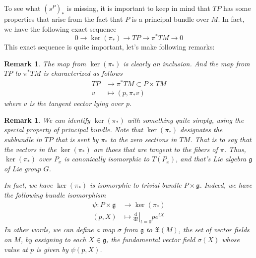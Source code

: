 \documentclass[11pt]{amsart}
\numberwithin{equation}{section}
\theoremstyle{plain}
\theoremstyle{plain}
\newtheorem{remksub}[thmsub]{Remark}
\numberwithin{equation}{section}
\begin{document}
To see what $(s^P)_*$ is missing, it is important to keep in mind that $TP$ has some properties that arise from the fact that $P$ is a principal bundle over $M$. In fact, we have the following exact sequence
\begin{equation}\label{1}
0\to\operatorname{ker}(\pi_*)\to TP\to\pi^*TM\to 0
\end{equation}
This exact sequence is quite important, let's make following remarks:
\begin{remksub}\normalfont
The map from $\operatorname{ker}(\pi_*)$ is clearly an inclusion. And the map from $TP$ to $\pi^*TM$ is characterized as follows
$$
\begin{aligned}
TP&\to \pi^*TM\subset P\times TM\\
v&\mapsto (p,\pi_*v)
\end{aligned}
$$
where $v$ is the tangent vector lying over $p$.
\end{remksub}
\begin{remksub}\normalfont
We can identify $\operatorname{ker}(\pi_*)$ with something quite simply, using the special property of principal bundle. Note that $\operatorname{ker}(\pi_*)$ designates the subbundle in $TP$ that is sent by $\pi_*$ to the zero sections in $TM$. That is to say that the vectors in the $\operatorname{ker}(\pi_*)$ are thoes that are tangent to the fibers of $\pi$. Thus, $\operatorname{ker}(\pi_*)$ over $P_x$ is canonically isomorphic to $T(P_x)$, and that's Lie algebra $\mathfrak{g}$ of Lie group $G$.

In fact, we have $\operatorname{ker}(\pi_*)$ is isomorphic to trivial bundle $P\times\mathfrak{g}$. Indeed, we have the following bundle isomorphism
$$
\begin{aligned}
\psi:P\times\mathfrak{g}&\to\operatorname{ker}(\pi_*)\\
(p,X)&\mapsto \left.\frac{\mathrm{d}}{\mathrm{d} t}\right|_{t=0}pe^{tX}
\end{aligned}
$$
In other words, we can define a map $\sigma$ from $\mathfrak{g}$ to $\mathfrak{X}(M)$, the set of vector fields on $M$, by assigning to each $X\in\mathfrak{g}$, the fundamental vector field $\sigma(X)$ whose value at $p$ is given by $\psi(p,X)$.
\end{remksub}
\end{document}
